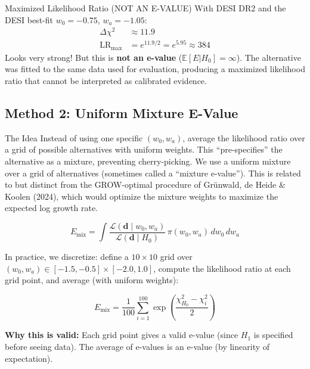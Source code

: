 \documentclass[11pt,a4paper]{article}
\newcommand{\E}{\mathbb{E}}
\begin{document}
\begin{examplebox}{Maximized Likelihood Ratio (NOT AN E-VALUE)}
With DESI DR2 and the DESI best-fit $w_0 = -0.75$, $w_a = -1.05$:
\begin{align}
\Delta\chi^2 &\approx 11.9 \\
\text{LR}_{\text{max}} &= e^{11.9/2} = e^{5.95} \approx 384
\end{align}
Looks very strong! But this is \textbf{not an e-value} ($\E[E|H_0]=\infty$). The alternative was fitted to the same data used for evaluation, producing a maximized likelihood ratio that cannot be interpreted as calibrated evidence.
\end{examplebox}


\subsection{Method 2: Uniform Mixture E-Value}

\begin{conceptbox}{The Idea}
Instead of using one specific $(w_0, w_a)$, average the likelihood ratio over a grid of possible alternatives with uniform weights. This ``pre-specifies'' the alternative as a mixture, preventing cherry-picking. We use a uniform mixture over a grid of alternatives (sometimes called a ``mixture e-value''). This is related to but distinct from the GROW-optimal procedure of Gr\"unwald, de Heide \& Koolen (2024), which would optimize the mixture weights to maximize the expected log growth rate.
\end{conceptbox}

\begin{equation}
E_{\text{mix}} = \int \frac{\mathcal{L}(\mathbf{d} \mid w_0, w_a)}{\mathcal{L}(\mathbf{d} \mid H_0)} \, \pi(w_0, w_a) \, dw_0 \, dw_a
\label{eq:uniform_mixture}
\end{equation}

In practice, we discretize: define a $10 \times 10$ grid over $(w_0, w_a) \in [-1.5, -0.5] \times [-2.0, 1.0]$, compute the likelihood ratio at each grid point, and average (with uniform weights):

\begin{equation}
E_{\text{mix}} = \frac{1}{100}\sum_{i=1}^{100} \exp\!\left(\frac{\chi^2_{H_0} - \chi^2_i}{2}\right)
\end{equation}

\textbf{Why this is valid:} Each grid point gives a valid e-value (since $H_1$ is specified before seeing data). The average of e-values is an e-value (by linearity of expectation).
\end{document}
